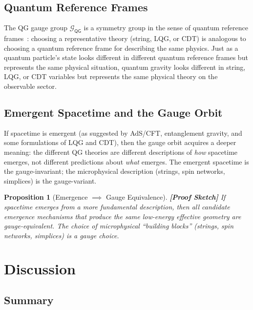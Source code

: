 \documentclass[12pt,a4paper]{article}
\newtheorem{proposition}[theorem]{Proposition}
\theoremstyle{remark}
\newcommand{\G}{\mathcal{G}}
\newcommand{\QG}{\textsf{QG}}
\newcommand{\rigorSketch}{\textbf{[Proof Sketch]}}
\begin{document}
\subsection{Quantum Reference Frames}

The QG gauge group $\G_{\QG}$ is a symmetry group in the sense of quantum reference frames~\cite{giacomini2019quantum}: choosing a representative theory (string, LQG, or CDT) is analogous to choosing a quantum reference frame for describing the same physics. Just as a quantum particle's state looks different in different quantum reference frames but represents the same physical situation, quantum gravity looks different in string, LQG, or CDT variables but represents the same physical theory on the observable sector.

\subsection{Emergent Spacetime and the Gauge Orbit}

If spacetime is emergent (as suggested by AdS/CFT, entanglement gravity, and some formulations of LQG and CDT), then the gauge orbit acquires a deeper meaning: the different QG theories are different descriptions of \emph{how} spacetime emerges, not different predictions about \emph{what} emerges. The emergent spacetime is the gauge-invariant; the microphysical description (strings, spin networks, simplices) is the gauge-variant.

\begin{proposition}[Emergence $\implies$ Gauge Equivalence]
\label{prop:emergence_gauge}
\rigorSketch
If spacetime emerges from a more fundamental description, then all candidate emergence mechanisms that produce the same low-energy effective geometry are gauge-equivalent. The choice of microphysical ``building blocks'' (strings, spin networks, simplices) is a gauge choice.
\end{proposition}


\section{Discussion}
\label{sec:discussion}

\subsection{Summary}
\end{document}
